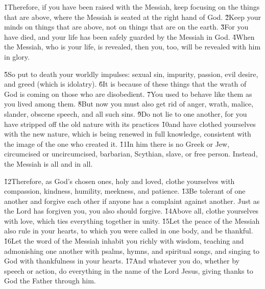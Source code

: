 \v{1}Therefore, if you have been raised with the Messiah, keep focusing on the things that are above, where the Messiah is seated at the right hand of God. \v{2}Keep your minds on things that are above, not on things that are on the earth. \v{3}For you have died, and your life has been safely guarded by the Messiah in God. \v{4}When the Messiah, who is your life, is revealed, then you, too, will be revealed with him in glory.

\v{5}So put to death your worldly impulses: sexual sin, impurity, passion, evil desire, and greed (which is idolatry). \v{6}It is because of these things that the wrath of God is coming on those who are disobedient. \v{7}You used to behave like them as you lived among them. \v{8}But now you must also get rid of anger, wrath, malice, slander, obscene speech, and all such sins. \v{9}Do not lie to one another, for you have stripped off the old nature with its practices \v{10}and have clothed yourselves with the new nature, which is being renewed in full knowledge, consistent with the image of the one who created it. \v{11}In him there is no Greek or Jew, circumcised or uncircumcised, barbarian, Scythian, slave, or free person. Instead, the Messiah is all and in all.

\v{12}Therefore, as God's chosen ones, holy and loved, clothe yourselves with compassion, kindness, humility, meekness, and patience. \v{13}Be tolerant of one another and forgive each other if anyone has a complaint against another. Just as the Lord has forgiven you, you also should forgive. \v{14}Above all, clothe yourselves with love, which ties everything together in unity. \v{15}Let the peace of the Messiah also rule in your hearts, to which you were called in one body, and be thankful. \v{16}Let the word of the Messiah inhabit you richly with wisdom, teaching and admonishing one another with psalms, hymns, and spiritual songs, and singing to God with thankfulness in your hearts. \v{17}And whatever you do, whether by speech or action, do everything in the name of the Lord Jesus, giving thanks to God the Father through him.

